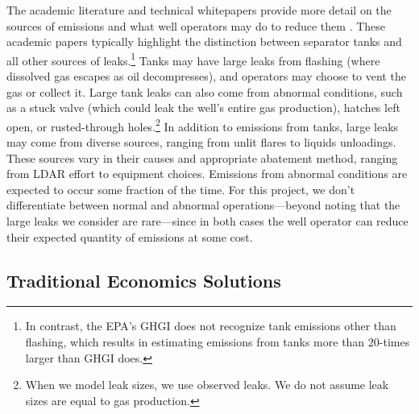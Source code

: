 \documentclass[12pt,oneside,letterpaper]{article}
\theoremstyle{definition}
\begin{document}
\begin{refsection}
The academic literature and technical whitepapers provide more detail on the sources of emissions and what well operators may do to reduce them
\parencite{%
Lyon/Alvarez/Zavala-Araiza/Brandt/Jackson/Hamburg:2016,
Rutherford/etal:2021,
Ravikumar/etal:2020,
Robertson/etal:2020,
ICF-abatement:2014,
}.
These academic papers typically highlight the distinction between separator tanks and all other sources of leaks.\footnote{%
In contrast, the \gls{EPA}'s \gls{GHGI} does not recognize tank emissions other than flashing, which results in \textcite{Rutherford/etal:2021} estimating emissions from tanks more than 20-times larger than \gls{GHGI} does.
}
Tanks may have large leaks from flashing (where dissolved gas escapes as oil decompresses), and operators may choose to vent the gas or collect it.
Large tank leaks can also come from abnormal conditions, such as a stuck valve (which could leak the well's entire gas production), hatches left open, or rusted-through holes.\footnote{%
When we model leak sizes, we use observed leaks.
We do not assume leak sizes are equal to gas production.
}
In addition to emissions from tanks, large leaks may come from diverse sources, ranging from unlit flares to liquids unloadings.
These sources vary in their causes and appropriate abatement method, ranging from \gls{LDAR} effort to equipment choices.
Emissions from abnormal conditions are expected to occur some fraction of the time.
For this project, we don't differentiate between normal and abnormal operations---beyond noting that the large leaks we consider are rare---since in both cases the well operator can reduce their expected quantity of emissions at some cost.


\subsection{Traditional Economics Solutions}
\label{sec:traditional-economics-solutions}


\end{refsection}
\end{document}
